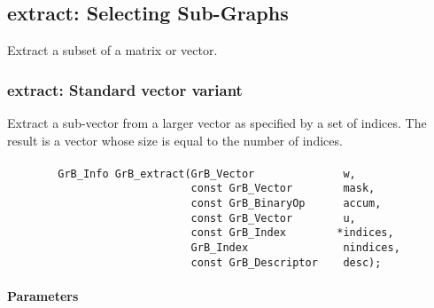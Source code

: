 \subsection{{\sf extract}: Selecting Sub-Graphs}
\label{Sec:extract}

Extract a subset of a matrix or vector. 


\subsubsection{{\sf extract}: Standard vector variant}

Extract a sub-vector from a larger vector as specified by a set of indices. 
The result is a vector whose size is equal to the number of indices.

\paragraph{\syntax}

\begin{verbatim}
        GrB_Info GrB_extract(GrB_Vector              w,
                             const GrB_Vector        mask,
                             const GrB_BinaryOp      accum,
                             const GrB_Vector        u,
                             const GrB_Index        *indices,
                             GrB_Index               nindices,
                             const GrB_Descriptor    desc);
\end{verbatim}

\paragraph{Parameters}

